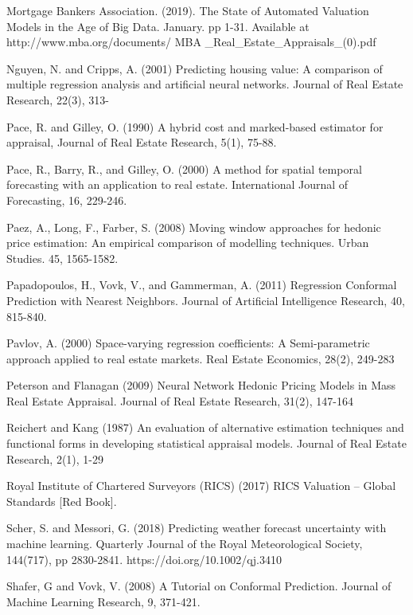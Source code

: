 \documentclass[colTwo]{anon}
\theoremstyle{definition}
\begin{document}
\begin{thebibliography}{50}
\harvarditem{}{}{}Mortgage Bankers Association. (2019). The State of Automated Valuation Models in the Age of Big Data. January. pp 1-31. Available at http://www.mba.org/documents/ MBA \_Real\_Estate\_Appraisals\_(0).pdf

\harvarditem{}{}{}Nguyen, N. and Cripps, A. (2001) Predicting housing value: A comparison of multiple regression analysis and artificial neural networks. Journal of Real Estate Research, 22(3), 313-

\harvarditem{}{}{}Pace, R. and Gilley, O. (1990) A hybrid cost and marked-based estimator for appraisal, Journal of Real Estate Research, 5(1), 75-88.

\harvarditem{}{}{}Pace, R., Barry, R., and Gilley, O. (2000) A method for spatial temporal forecasting with an application to real estate.  International Journal of Forecasting, 16, 229-246.

\harvarditem{}{}{}Paez, A., Long, F., Farber, S. (2008) Moving window approaches for hedonic price estimation: An empirical comparison of modelling techniques. Urban Studies. 45, 1565-1582.

\harvarditem{}{}{} Papadopoulos, H., Vovk, V., and Gammerman, A. (2011) Regression Conformal Prediction with Nearest Neighbors. Journal of Artificial Intelligence Research, 40, 815-840.

\harvarditem{}{}{}Pavlov, A. (2000) Space-varying regression coefficients: A Semi-parametric approach applied to real estate markets. Real Estate Economics, 28(2), 249-283

\harvarditem{}{}{}Peterson and Flanagan (2009) Neural Network Hedonic Pricing Models in Mass Real Estate Appraisal. Journal of Real Estate Research,  31(2), 147-164

\harvarditem{}{}{}Reichert and Kang (1987) An evaluation of alternative estimation techniques and functional forms in developing statistical appraisal models. Journal of Real Estate Research, 2(1), 1-29

\harvarditem{}{}{}Royal Institute of Chartered Surveyors (RICS) (2017) RICS Valuation – Global Standards [Red Book].

\harvarditem{}{}{}Scher, S. and Messori, G. (2018) Predicting weather forecast uncertainty with machine learning. Quarterly Journal of the Royal Meteorological Society, 144(717), pp 2830-2841.  https://doi.org/10.1002/qj.3410

\harvarditem{}{}{}Shafer, G and Vovk, V. (2008) A Tutorial on Conformal Prediction. Journal of Machine Learning Research, 9, 371-421.


\end{thebibliography}
\end{document}
